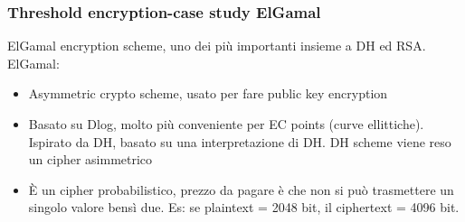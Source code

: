 \documentclass[16px]{article}
\begin{document}
\subsubsection{Threshold encryption-case study ElGamal}
ElGamal encryption scheme, uno dei più importanti insieme a DH ed RSA. ElGamal:
\begin{itemize}
\item Asymmetric crypto scheme, usato per fare public key encryption
\item Basato su Dlog, molto più conveniente per EC points (curve ellittiche). Ispirato da DH, basato su una interpretazione di DH. DH scheme viene reso un cipher asimmetrico
\item È un cipher probabilistico, prezzo da pagare è che non si può trasmettere un singolo valore bensì due. Es: se plaintext = 2048 bit, il ciphertext = 4096 bit.
\end{itemize}
\end{document}
